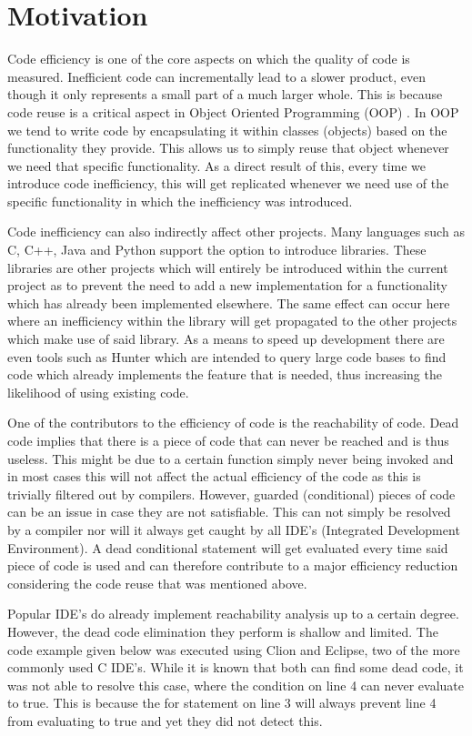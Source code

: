 \documentclass[12pt]{article}
\begin{document}
\section{Motivation}
Code efficiency is one of the core aspects on which the quality of code is measured. Inefficient code can incrementally lead to a slower product, even though it only represents a small part of a much larger whole. This is because code reuse is a critical aspect in Object Oriented Programming (OOP) \cite{10.1145/71605.71612}. In OOP we tend to write code by encapsulating it within classes (objects) based on the functionality they provide. This allows us to simply reuse that object whenever we need that specific functionality. As a direct result of this, every time we introduce code inefficiency, this will get replicated whenever we need use of the specific functionality in which the inefficiency was introduced.

Code inefficiency can also indirectly affect other projects. Many languages such as C, C++, Java and Python support the option to introduce libraries. These libraries are other projects which will entirely be introduced within the current project as to prevent the need to add a new implementation for a functionality which has already been implemented elsewhere. The same effect can occur here where an inefficiency within the library will get propagated to the other projects which make use of said library. As a means to speed up development there are even tools such as Hunter \cite{10.1145/2950290.2983934} which are intended to query large code bases to find code which already implements the feature that is needed, thus increasing the likelihood of using existing code.

One of the contributors to the efficiency of code is the reachability of code. Dead code implies that there is a piece of code that can never be reached and is thus useless. This might be due to a certain function simply never being invoked and in most cases this will not affect the actual efficiency of the code as this is trivially filtered out by compilers. However, guarded (conditional) pieces of code can be an issue in case they are not satisfiable. This can not simply be resolved by a compiler nor will it always get caught by all IDE's (Integrated Development Environment). A dead conditional statement will get evaluated every time said piece of code is used and can therefore contribute to a major efficiency reduction considering the code reuse that was mentioned above.

Popular IDE's do already implement reachability analysis up to a certain degree. However, the dead code elimination they perform is shallow and limited. The code example given below was executed using Clion and Eclipse, two of the more commonly used C IDE's. While it is known that both can find some dead code, it was not able to resolve this case, where the condition on line 4 can never evaluate to true. This is because the for statement on line 3 will always prevent line 4 from evaluating to true and yet they did not detect this.
\end{document}
